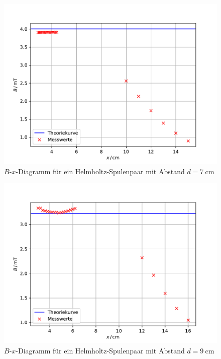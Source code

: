 \begin{figure}[H]
  \centering
  \includegraphics[width=\textwidth]{Plots/helm1.pdf}
  \caption{$B$-$x$-Diagramm für ein Helmholtz-Spulenpaar mit Abstand $d = \SI{7}{\centi \meter}$}
  \label{fig:helm1}
\end{figure}
\begin{figure}[H]
  \centering
  \includegraphics[width=\textwidth]{Plots/helm2.pdf}
  \caption{$B$-$x$-Diagramm für ein Helmholtz-Spulenpaar mit Abstand $d = \SI{9}{\centi \meter}$}
  \label{fig:helm2}
\end{figure}
